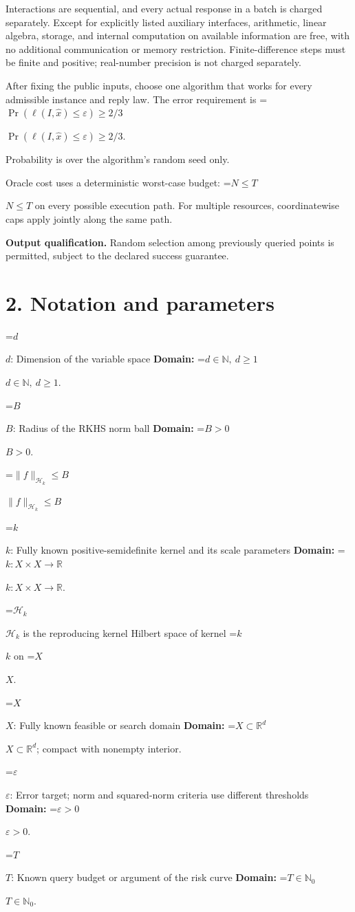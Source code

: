 \documentclass[10pt,a4paper]{article}
\newcommand{\AtlasMath}[1]{\par\begingroup\centering\setbox0=\hbox{$\displaystyle #1$}\ifdim\wd0>1.4\linewidth\typeout{ATLAS WIDE FORMULA: \the\wd0}\fi\ifdim\wd0>\linewidth\resizebox{\linewidth}{!}{\box0}\else\box0\fi\par\endgroup}
\newcommand{\AtlasInlineMath}[1]{\begingroup\setbox0=\hbox{$#1$}\ifdim\wd0>.4\linewidth\endgroup\AtlasMath{#1}\else\endgroup$#1$\fi}
\begin{document}
Interactions are sequential, and every actual response in a batch is charged separately. Except for explicitly listed auxiliary interfaces, arithmetic, linear algebra, storage, and internal computation on available information are free, with no additional communication or memory restriction. Finite-difference steps must be finite and positive; real-number precision is not charged separately.

After fixing the public inputs, choose one algorithm that works for every admissible instance and reply law. The error requirement is \AtlasInlineMath{\Pr(\ell(I,\widehat{x})\le \varepsilon)\ge2/3}.

Probability is over the algorithm's random seed only.

Oracle cost uses a deterministic worst-case budget: \AtlasInlineMath{N\le T} on every possible execution path. For multiple resources, coordinatewise caps apply jointly along the same path.

\textbf{Output qualification.} Random selection among previously queried points is permitted, subject to the declared success guarantee.

\section{2. Notation and parameters}
\AtlasInlineMath{d}: Dimension of the variable space \textbf{Domain:} \AtlasInlineMath{d\in\mathbb{N},\ d\ge1}.

\AtlasInlineMath{B}: Radius of the RKHS norm ball \textbf{Domain:} \AtlasInlineMath{B>0}.

\AtlasInlineMath{\|f\|_{\mathcal{H}_k}\le B}

\AtlasInlineMath{k}: Fully known positive-semidefinite kernel and its scale parameters \textbf{Domain:} \AtlasInlineMath{k:X\times X\to\mathbb{R}}.

\AtlasInlineMath{\mathcal{H}_k} is the reproducing kernel Hilbert space of kernel \AtlasInlineMath{k} on \AtlasInlineMath{X}.

\AtlasInlineMath{X}: Fully known feasible or search domain \textbf{Domain:} \AtlasInlineMath{X\subset\mathbb{R}^d}; compact with nonempty interior.

\AtlasInlineMath{\varepsilon}: Error target; norm and squared-norm criteria use different thresholds \textbf{Domain:} \AtlasInlineMath{\varepsilon>0}.

\AtlasInlineMath{T}: Known query budget or argument of the risk curve \textbf{Domain:} \AtlasInlineMath{T\in\mathbb{N}_0}.
\end{document}
